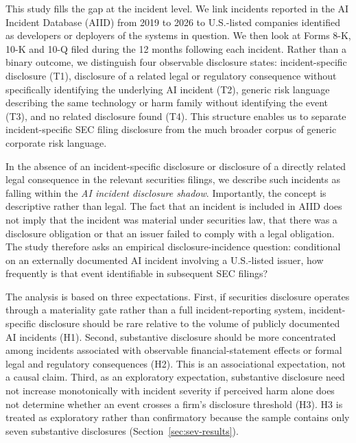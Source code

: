 \documentclass[utf8]{FrontiersinHarvard}
\begin{document}
This study fills the gap at the incident level. We link incidents reported in the AI Incident Database (AIID) from 2019 to 2026 to U.S.-listed companies identified as developers or deployers of the systems in question. We then look at Forms 8-K, 10-K and 10-Q filed during the 12 months following each incident. Rather than a binary outcome, we distinguish four observable disclosure states: incident-specific disclosure (T1), disclosure of a related legal or regulatory consequence without specifically identifying the underlying AI incident (T2), generic risk language describing the same technology or harm family without identifying the event (T3), and no related disclosure found (T4). This structure enables us to separate incident-specific SEC filing disclosure from the much broader corpus of generic corporate risk language.

In the absence of an incident-specific disclosure or disclosure of a directly related legal consequence in the relevant securities filings, we describe such incidents as falling within the \textit{AI incident disclosure shadow}. Importantly, the concept is descriptive rather than legal. The fact that an incident is included in AIID does not imply that the incident was material under securities law, that there was a disclosure obligation or that an issuer failed to comply with a legal obligation. The study therefore asks an empirical disclosure-incidence question: conditional on an externally documented AI incident involving a U.S.-listed issuer, how frequently is that event identifiable in subsequent SEC filings?

The analysis is based on three expectations. First, if securities disclosure operates through a materiality gate rather than a full incident-reporting system, incident-specific disclosure should be rare relative to the volume of publicly documented AI incidents (H1). Second, substantive disclosure should be more concentrated among incidents associated with observable financial-statement effects or formal legal and regulatory consequences (H2). This is an associational expectation, not a causal claim. Third, as an exploratory expectation, substantive disclosure need not increase monotonically with incident severity if perceived harm alone does not determine whether an event crosses a firm's disclosure threshold (H3). H3 is treated as exploratory rather than confirmatory because the sample contains only seven substantive disclosures (Section~\ref{sec:sev-results}).
\end{document}
